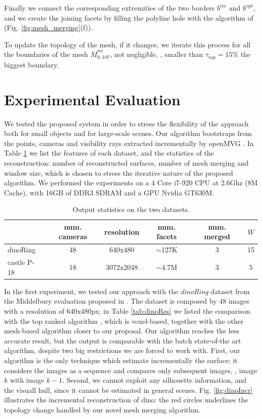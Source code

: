 Finally we connect the corresponding extremities of the two borders $\mathit{b}^{\text{rec}}$ and $\mathit{b}^{\text{opt}}$, and we create the joining facets by filling the polyline hole with the algorithm of \cite{liepa2003filling}  (Fig. \ref{fig:mesh_merging}(f)).

To update the topology of the mesh, if it changes, we iterate this process for all the boundaries of the mesh  $\mathit{\bar{M}}_{0..kW}^{\text{rec}}$, not negligible, \ie, smaller than $\tau_{\text{top}}= 15\%$ the biggest boundary.



\section{Experimental Evaluation}
\label{sec:exp}
We tested the proposed system in order to stress the flexibility of the approach both for small objects and for large-scale scenes. 
Our algorithm bootstraps from the points, cameras and visibility rays extracted incrementally by openMVG \cite{openMVG}. In Table \ref{fig:expData} we list the features of each dataset, and the statistics of the reconstruction: number of reconstructed surfaces, number of mesh merging and window size, which is chosen to stress the iterative nature of the proposed algorithm.
We performed the experiments on a 4 Core i7-920 CPU at 2.6Ghz (8M Cache), with 16GB of DDR3 SDRAM and a GPU Nvidia GT630M.


\begin{table}[t]
\normalsize
\centering
\setlength{\tabcolsep}{1px}
  \caption{Output statistics on the two datasets.}
  \label{fig:expData}
\begin{tabular}{lccccc}
&num. cameras& resolution&num. facets& num. merged &$W$ \\
\hline
dinoRing&48&640x480&$\sim$127K&3&15\\
castle P-18&18&3072x2048&$\sim$4.7M&3&5\\
\end{tabular}
\end{table}

In the first experiment, we tested our approach with the \emph{dinoRing} dataset  from the Middelbury evaluation proposed in \cite{seitz2006comparison}. 
The dataset is composed by 48 images with a resolution of 640x480px; in Table \ref{tab:dinoRes} we listed the comparison with the top ranked algorithm \cite{savinov2016semantic}, which is voxel-based, together with the other mesh-based algorithm closer to our proposal.
Our algorithm reaches the less accurate result, but  the output is comparable with the batch state-of-the art algorithm, despite two big restrictions we are forced to work with.
First, our algorithm is the only technique  which estimate incrementally the surface; it considers the images as a sequence and compares only subsequent images, \ie, image $k$ with image $k-1$.
Second, we cannot exploit any silhouette information, and the visuall hull, since it cannot be estimated in general scenes.
Fig. \ref{fig:dinoIncr} illustrates the incremental reconstruction of dino: the red circles underlines the topology change handled by our novel mesh merging algorithm.

